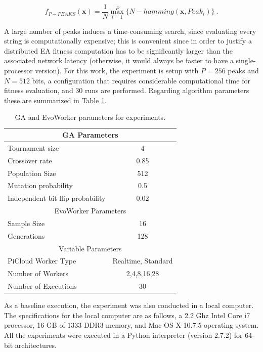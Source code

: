 \begin{equation}
f_{P-PEAKS}(\mathbf{x})=\frac{1}{N} \overset{P}{\max_{i=1}} \{N-hamming(\mathbf{x},Peak_i)   \} \ .
\end{equation}

A large number of peaks induces a time-consuming search,
since evaluating every string is computationally expensive; this is
convenient since in order to justify a distributed EA fitness computation has to be significantly larger than the associated
network latency (otherwise, it would always be faster to have a single-processor version).
For this work, the experiment is setup with $P = 256$ peaks and $N = 512$ bits, a configuration that requires considerable computational time for
fitness evaluation, and 30 runs are performed.
Regarding algorithm parameters these are summarized in Table \ref{tab:paramse}.

\begin{table}[t]
\renewcommand{\arraystretch}{1.3}
\caption{GA and EvoWorker parameters for experiments.}
\label{tab:paramse}
\centering
\begin{tabular}{|l||c|}
\hline
\multicolumn{2}{|c|}{GA Parameters} \\
\hline
Tournament size & 4 \\
Crossover rate & 0.85  \\
Population Size & 512 \\
Mutation probability & 0.5 \\
Independent bit flip probability  & 0.02 \\
\hline
\multicolumn{2}{|c|}{EvoWorker Parameters} \\
\hline
Sample Size & 16 \\
Generations & 128 \\
\hline
\multicolumn{2}{|c|}{Variable Parameters} \\
\hline
PiCloud Worker Type & Realtime, Standard \\
Number of Workers & 2,4,8,16,28 \\
Number of Executions & 30 \\
\hline

\end{tabular}
\end{table}

As a baseline execution, the experiment was also conducted in a local computer. The specifications for the local computer are as follows, a
2.2 Ghz Intel Core i7 processor, 16 GB of 1333 DDR3 memory, and Mac OS
X 10.7.5 operating system. All the experiments were executed in a Python
interpreter (version 2.7.2) for 64-bit architectures. 

